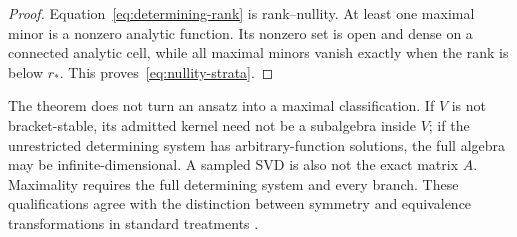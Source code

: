 \documentclass[11pt]{article}
\theoremstyle{definition}
\begin{document}
\begin{proof}
Equation~\eqref{eq:determining-rank} is rank--nullity. At least one maximal
minor is a nonzero analytic function. Its nonzero set is open and dense on a
connected analytic cell, while all maximal minors vanish exactly when the
rank is below $r_*$. This proves~\eqref{eq:nullity-strata}.
\end{proof}

The theorem does not turn an ansatz into a maximal classification. If $V$ is
not bracket-stable, its admitted kernel need not be a subalgebra inside $V$;
if the unrestricted determining system has arbitrary-function solutions, the
full algebra may be infinite-dimensional. A sampled SVD is also not the exact
matrix $A$. Maximality requires the full determining system and every branch.
These qualifications agree with the distinction between symmetry and
equivalence transformations in standard treatments \cite{olver,oliveri2026}.
\end{document}
